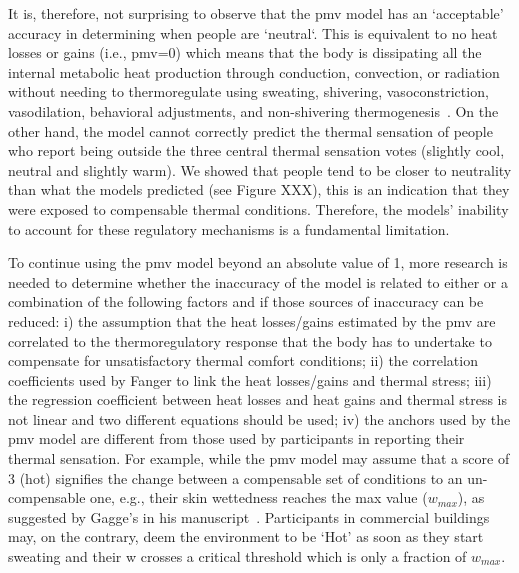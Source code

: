 It is, therefore, not surprising to observe that the \ac{pmv} model has an `acceptable' accuracy in determining when people are `neutral`.
This is equivalent to no heat losses or gains (i.e., \ac{pmv}=0) which means that the body is dissipating all the internal metabolic heat production through conduction, convection, or radiation without needing to thermoregulate using sweating, shivering, vasoconstriction, vasodilation, behavioral adjustments, and non-shivering thermogenesis~\cite{ romanovsky_thermoregulation_2018}.
On the other hand, the model cannot correctly predict the thermal sensation of people who report being outside the three central thermal sensation votes (slightly cool, neutral and slightly warm).
We showed that people tend to be closer to neutrality than what the models predicted (see Figure XXX), this is an indication that they were exposed to compensable thermal conditions. %
Therefore, the models' inability to account for these regulatory mechanisms is a fundamental limitation.

To continue using the \ac{pmv} model beyond an absolute value of 1, more research is needed to determine whether the inaccuracy of the model is related to either or a combination of the following factors and if those sources of inaccuracy can be reduced: 
i) the assumption that the heat losses/gains estimated by the \ac{pmv} are correlated to the thermoregulatory response that the body has to undertake to compensate for unsatisfactory thermal comfort conditions;
ii) the correlation coefficients used by Fanger to link the heat losses/gains and thermal stress;
iii) the regression coefficient between heat losses and heat gains and thermal stress is not linear and two different equations should be used;
iv) the anchors used by the \ac{pmv} model are different from those used by participants in reporting their thermal sensation.
For example, while the \ac{pmv} model may assume that a score of 3 (hot) signifies the change between a compensable set of conditions to an un-compensable one, e.g., their skin wettedness reaches the max value ($w_{max}$), as suggested by Gagge's in his manuscript~\cite{GaggeSET}.
Participants in commercial buildings may, on the contrary, deem the environment to be `Hot' as soon as they start sweating and their \ac{w} crosses a critical threshold which is only a fraction of $w_{max}$.

